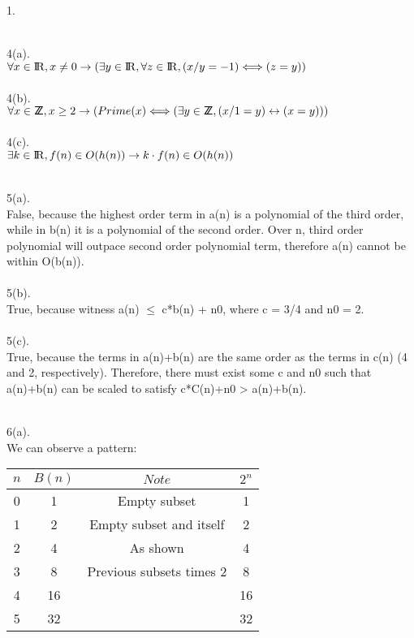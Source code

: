 \documentclass[a4paper, 20pt,fleqn]{article}
\begin{document}
\begin{question}{1.}
\newpage



\newpage
\\4(a).
\\$\forall x \in \R, x \ne 0 \rightarrow (\exists y \in \R, \forall z \in \R, (x/y = -1) \Longleftrightarrow (z = y))$
\\
\\4(b).
\\$\forall x \in \Z, x \ge 2 \rightarrow (Prime(x) \Longleftrightarrow (\exists y \in \Z, (x/1 = y) \leftrightarrow (x = y)))$
\\
\\4(c).
\\$\exists k \in \R, f(n) \in O(h(n)) \rightarrow k \cdot f(n) \in O(h(n))$
\\ [Assuming f(n), h(n), and O(n) is previously defined in definition of O(n)]
\newpage


\newpage
\\5(a).
\\ False, because the highest order term in a(n) is a polynomial of the third order, while in b(n) it is a polynomial of the second order. Over n, third order polynomial will outpace second order polynomial term, therefore a(n) cannot be within O(b(n)).
\\
\\5(b).
\\True, because witness a(n) $\le$ c*b(n) + n0, where c = 3/4 and n0 = 2.
\\
\\5(c).
\\True, because the terms in a(n)+b(n) are the same order as the terms in c(n) (4 and 2, respectively). Therefore, there must exist some c and n0 such that a(n)+b(n) can be scaled to satisfy c*C(n)+n0 > a(n)+b(n). 
\newpage

\newpage
\\6(a).
\\We can observe a pattern:
\\
\begin{tabular}{c c c c}
    $n$ & $B(n)$ & $Note$ & $2^n$\\
    \hline
    0 & 1 & Empty subset&1\\
    1 & 2 & Empty subset and itself&2\\
    2 & 4 & As shown&4\\
    3 & 8 & Previous subsets times 2&8\\
    4 & 16 &&16\\
    5 & 32 &&32\\
    

\end{tabular}
\end{question}
\end{document}
